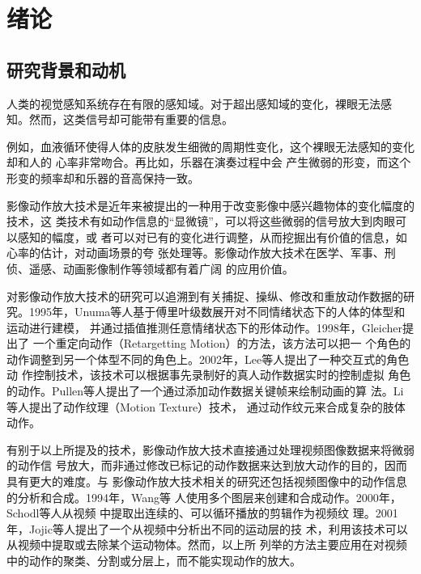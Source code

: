 \chapter{绪论}

\section{研究背景和动机}

人类的视觉感知系统存在有限的感知域。对于超出感知域的变化，裸眼无法感
知。然而，这类信号却可能带有重要的信息。

例如，血液循环使得人体的皮肤发生细微的周期性变化，这个裸眼无法感知的变化却和人的
心率非常吻合。再比如，乐器在演奏过程中会
产生微弱的形变，而这个形变的频率却和乐器的音高保持一致。

影像动作放大技术是近年来被提出的一种用于改变影像中感兴趣物体的变化幅度的技术，这
类技术有如动作信息的“显微镜”，可以将这些微弱的信号放大到肉眼可以感知的幅度，或
者可以对已有的变化进行调整，从而挖掘出有价值的信息，如心率的估计，对动画场景的夸
张处理等。影像动作放大技术在医学、军事、刑侦、遥感、动画影像制作等领域都有着广阔
的应用价值。

对影像动作放大技术的研究可以追溯到有关捕捉、操纵、修改和重放动作数据的研
究。1995年，Unuma等人基于傅里叶级数展开对不同情绪状态下的人体的体型和运动进行建模，
并通过插值推测任意情绪状态下的形体动作。1998年，Gleicher提出了
一个重定向动作（Retargetting Motion）的方法，该方法可以把一
个角色的动作调整到另一个体型不同的角色上。2002年，Lee等人提出了一种交互式的角色动
作控制技术，该技术可以根据事先录制好的真人动作数据实时的控制虚拟
角色的动作。Pullen等人提出了一个通过添加动作数据关键帧来绘制动画的算
法。Li等人提出了动作纹理（Motion Texture）技术，
通过动作纹元来合成复杂的肢体动作。

有别于以上所提及的技术，影像动作放大技术直接通过处理视频图像数据来将微弱的动作信
号放大，而非通过修改已标记的动作数据来达到放大动作的目的，因而具有更大的难度。与
影像动作放大技术相关的研究还包括视频图像中的动作信息的分析和合成。1994年，Wang等
人使用多个图层来创建和合成动作。2000年，Schodl等人从视频
中提取出连续的、可以循环播放的剪辑作为视频纹
理。2001年，Jojic等人提出了一个从视频中分析出不同的运动层的技
术，利用该技术可以从视频中提取或去除某个运动物体。然而，以上所
列举的方法主要应用在对视频中的动作的聚类、分割或分层上，而不能实现动作的放大。

